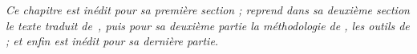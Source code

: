 \stars


\textit{Ce chapitre est inédit pour sa première section ; reprend dans sa deuxième section le texte traduit de~\cite{raimbault2015models}, puis pour sa deuxième partie la méthodologie de \cite{raimbault2016indirect}, les outils de \cite{bergeaud2017classifying}%
; et enfin est inédit pour sa dernière partie.}





